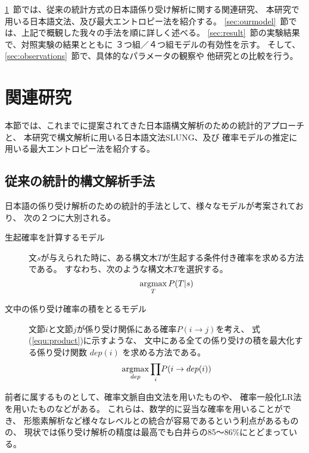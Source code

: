 \ref{sec:related}~節では、従来の統計方式の日本語係り受け解析に関する関連研究、
本研究で用いる日本語文法、及び最大エントロピー法を紹介する。
\ref{sec:ourmodel}~節では、上記で概観した我々の手法を順に詳しく述べる。
\ref{sec:result}~節の実験結果で、対照実験の結果とともに
３つ組／４つ組モデルの有効性を示す。
そして、\ref{sec:observations}~節で、具体的なパラメータの観察や
他研究との比較を行う。


\section{関連研究}\label{sec:related}

本節では、これまでに提案されてきた日本語構文解析のための統計的アプローチと、
本研究で構文解析に用いる日本語文法SLUNG、及び
確率モデルの推定に用いる最大エントロピー法を紹介する。

\subsection{従来の統計的構文解析手法}\label{subsec:conventional}

日本語の係り受け解析のための統計的手法として、様々なモデルが考案されており、
次の２つに大別される。

\begin{description}
\item[生起確率を計算するモデル]
文$s$が与えられた時に、ある構文木$T$が生起する条件付き確率を求める方法である。
すなわち、次のような構文木$T$を選択する。
\begin{equation}
\mathop{\rm argmax}_T P(T|s)
\end{equation} 
\item[文中の係り受け確率の積をとるモデル]
文節$i$と文節$j$が係り受け関係にある確率$P(i \rightarrow j)$を考え、
式(\ref{equ:product})に示すような、
文中にある全ての係り受けの積を最大化する係り受け関数 $dep(i)$ を求める方法である。
\begin{equation}
\mathop{\rm argmax}_{dep}
\displaystyle{\prod_i} P(i \rightarrow dep(i))
\label{equ:product}
\end{equation} 
\end{description}

前者に属するものとして、確率文脈自由文法を用いたもの\cite{Mori98}や、
確率一般化LR法を用いたもの\cite{Shirai98}などがある。
これらは、数学的に妥当な確率を用いることができ、
形態素解析など様々なレベルとの統合が容易であるという利点があるものの、
現状では係り受け解析の精度は最高でも白井らの85〜86$\%$にとどまっている。

